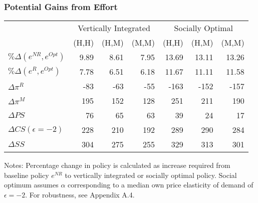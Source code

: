 \documentclass[aspectratio=169]{beamer}
\begin{document}
\begin{frame}
\frametitle{Potential Gains from Effort}
\begin{table}[htp]
\begin{center}
\begin{tabular}{|l | r r r | r r r |}
\hline
&  \multicolumn{3}{c|}{Vertically Integrated}& \multicolumn{3}{c|}{Socially Optimal}\\ 
 & (H,H) & (H,M) & (M,M)  & (H,H) & (H,M) & (M,M) \\ \hline
$\%\Delta(e^{NR}, e^{Opt})$ & 9.89 & 8.61 & 7.95 & 13.69 & 13.11 & 13.26 \\
$\%\Delta(e^{R}, e^{Opt})$ & 7.78 & 6.51 & 6.18 & 11.67 & 11.11 & 11.58 
 \\ \hline
$\Delta \pi^R$ & -83 & -63 & -55 & -163 & -152 & -157 \\
$\Delta \pi^M$ & 195 & 152 & 128 & 251 & 211 & 190 \\
$\Delta PS$ & 76 & 65 & 63 & 39 & 24 & 17 \\
$\Delta CS  (\epsilon=-2)$ & 228 & 210 & 192 & 289 & 290 & 284 \\
$\Delta SS$ & 304 & 275 & 255 & 329 & 313 & 301 \\ \hline
\end{tabular} 
\end{center}
\label{tab:effortnew}
\footnotesize
Notes: Percentage change in policy is calculated as increase required from baseline policy $e^{NR}$ to vertically integrated or socially optimal policy. Social optimum assumes $\alpha$ corresponding to a median own price elasticity of demand of $\epsilon=-2$. For robustness, see Appendix A.4.
\end{table}
\end{frame}
\end{document}
